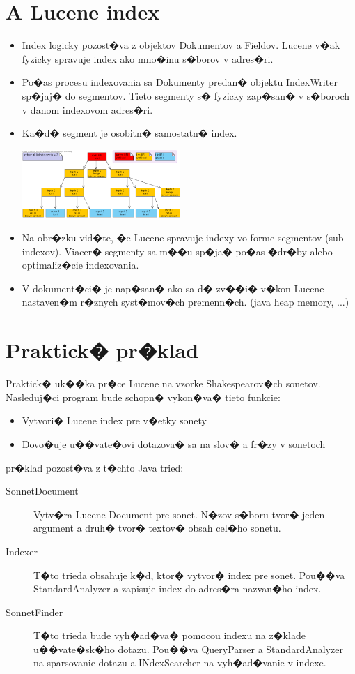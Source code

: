 \documentclass[11pt,a4paper]{article}
\begin{document}
\section{A Lucene index}
\begin{itemize}
\item Index logicky pozost�va z objektov Dokumentov a Fieldov. Lucene v�ak fyzicky spravuje index ako mno�inu s�borov v adres�ri.
\item Po�as procesu indexovania sa Dokumenty predan� objektu IndexWriter sp�jaj� do segmentov. Tieto segmenty s� fyzicky zap�san� v s�boroch v danom indexovom adres�ri.
\item Ka�d� segment je osobitn� samostatn� index.

\includegraphics[width=60mm]{depth.png}

\item Na obr�zku vid�te, �e Lucene spravuje indexy vo forme segmentov (sub-indexov). Viacer� segmenty sa m��u sp�ja� po�as �dr�by alebo optimaliz�cie indexovania.

\item V dokument�ci� je nap�san� ako sa d� zv��i� v�kon Lucene nastaven�m r�znych syst�mov�ch premenn�ch. (java heap memory, ...)
\end{itemize}

\newpage

\section{Praktick� pr�klad}

Praktick� uk��ka pr�ce Lucene na vzorke Shakespearov�ch sonetov.
Nasleduj�ci program bude schopn� vykon�va� tieto funkcie:

\begin{itemize}
\item Vytvori� Lucene index pre v�etky sonety
\item Dovo�uje u��vate�ovi dotazova� sa na slov� a fr�zy v sonetoch
\end{itemize}

pr�klad pozost�va z t�chto Java tried:

\begin{description}
\item[SonnetDocument] Vytv�ra Lucene Document pre sonet. N�zov s�boru tvor� jeden argument a druh� tvor� textov� obsah cel�ho sonetu.
\item[Indexer] T�to trieda obsahuje k�d, ktor� vytvor� index pre sonet. Pou��va StandardAnalyzer a zapisuje index do adres�ra nazvan�ho index.
\item[SonnetFinder] T�to trieda bude vyh�ad�va� pomocou indexu na z�klade u��vate�sk�ho dotazu. Pou��va QueryParser a StandardAnalyzer na sparsovanie dotazu a INdexSearcher na vyh�ad�vanie v indexe.
\end{description}
\end{document}
